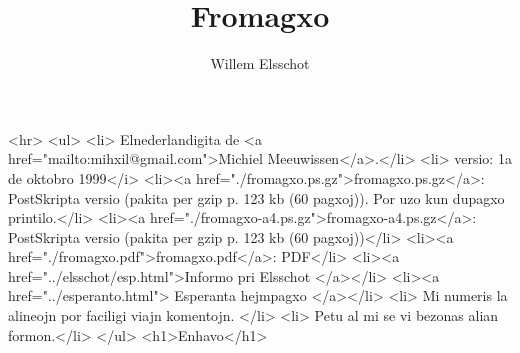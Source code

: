 
\title{Fromagxo}
\author{Willem Elsschot}
\date{}

\def\cxapitro#1{\section{#1}}

\def\rrim#1{}
\def\rim#1{}

\def\a#1{(#1)}
\def\ax#1#2{(#2)}



\maketitle
\begin{rawhtml}
<hr>
<ul>
<li> Elnederlandigita de <a href="mailto:mihxil@gmail.com">Michiel Meeuwissen</a>.</li>
<li> versio: 1a de oktobro 1999</i>
<li><a href="./fromagxo.ps.gz">fromagxo.ps.gz</a>: PostSkripta versio (pakita per gzip p. 123 kb
(60 pagxoj)). Por uzo kun dupagxo printilo.</li>
<li><a href="./fromagxo-a4.ps.gz">fromagxo-a4.ps.gz</a>: PostSkripta versio (pakita per gzip p. 123 kb
(60 pagxoj))</li>
<li><a href="./fromagxo.pdf">fromagxo.pdf</a>: PDF</li>
<li><a href="../elsschot/esp.html">Informo pri Elsschot </a></li>
<li><a href="../esperanto.html"> Esperanta hejmpagxo </a></li>
<li> Mi numeris la alineojn por faciligi viajn komentojn. </li>
<li> Petu al mi se vi bezonas alian formon.</li>
</ul>
<h1>Enhavo</h1>
\end{rawhtml}


























